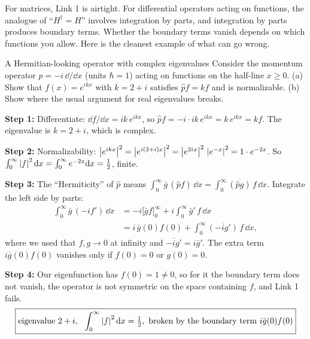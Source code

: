 For matrices, Link 1 is airtight. For differential operators acting on functions, the analogue of ``$H^\dagger=H$'' involves integration by parts, and integration by parts produces boundary terms. Whether the boundary terms vanish depends on which functions you allow. Here is the cleanest example of what can go wrong.

\begin{sample}{A Hermitian-looking operator with complex eigenvalues}
Consider the momentum operator $\hat p=-i\,\dd/\dd x$ (units $\hbar=1$) acting on functions on the half-line $x\ge0$. (a) Show that $f(x)=e^{ikx}$ with $k=2+i$ satisfies $\hat pf=kf$ and is normalizable. (b) Show where the usual argument for real eigenvalues breaks.

\textbf{Step 1:} Differentiate: $\dd f/\dd x=ik\,e^{ikx}$, so $\hat p f=-i\cdot ik\,e^{ikx}=k\,e^{ikx}=kf$. The eigenvalue is $k=2+i$, which is complex.

\textbf{Step 2:} Normalizability: $\left\lvert e^{ikx}\right\rvert^2=\left\lvert e^{i(2+i)x}\right\rvert^2=\left\lvert e^{2ix}\right\rvert^2\,\left\lvert e^{-x}\right\rvert^2=1\cdot e^{-2x}$. So $\int_0^\infty\left\lvert f\right\rvert^2\mathrm{d} x=\int_0^\infty e^{-2x}\mathrm{d} x=\tfrac12$, finite.

\textbf{Step 3:} The ``Hermiticity'' of $\hat p$ means $\int_0^\infty \bar g\,(\hat pf)\,\dd x=\int_0^\infty\overline{(\hat pg)}\,f\,\dd x$. Integrate the left side by parts:
\begin{align*}
\int_0^\infty \bar g\,(-i f')\,\dd x
&=-i\bigl[\bar g f\bigr]_0^\infty+i\int_0^\infty \bar g'\,f\,\dd x\\
&=i\,\bar g(0)f(0)+\int_0^\infty\overline{(-ig')}\,f\,\dd x ,
\end{align*}
where we used that $f,g\to0$ at infinity and $\overline{-ig'}=i\bar g'$. The extra term $i\bar g(0)f(0)$ vanishes only if $f(0)=0$ or $g(0)=0$.

\textbf{Step 4:} Our eigenfunction has $f(0)=1\neq0$, so for it the boundary term does not vanish, the operator is not symmetric on the space containing $f$, and Link 1 fails.
\[
\boxed{\text{eigenvalue }2+i,\ \ \int_0^\infty\left\lvert f\right\rvert^2\mathrm{d} x=\tfrac12,\ \text{broken by the boundary term } i\bar g(0)f(0)}
\]
\end{sample}

